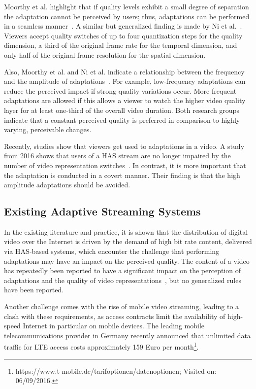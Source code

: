 Moorthy et al. highlight that if quality levels exhibit a small degree of separation the adaptation cannot be perceived by users; thus, adaptations can be performed in a seamless manner~\cite{Moorthy2012}.
A similar but generalized finding is made by Ni et al.~\cite{Ni2011}.
Viewers accept quality switches of up to four quantization steps for the quality dimension, a third of the original frame rate for the temporal dimension, and only half of the original frame resolution for the spatial dimension.

Also, Moorthy et al. and Ni et al. indicate a relationship between the frequency and the amplitude of adaptations~\cite{Moorthy2012,Ni2011}. 
For example, low-frequency adaptations can reduce the perceived impact if strong quality variations occur.
More frequent adaptations are allowed if this allows a viewer to watch the higher video quality layer for at least one-third of the overall video duration.
Both research groups indicate that a constant perceived quality is preferred in comparison to highly varying, perceivable changes.

Recently, studies show that viewers get used to adaptations in a video.
A study from 2016 shows that users of a \ac{HAS} stream are no longer impaired by the number of video representation switches~\cite{Nam2016}.
In contrast, it is more important that the adaptation is conducted in a covert manner.
Their finding is that the high amplitude adaptations should be avoided.
\subsection{Existing Adaptive Streaming Systems}
In the existing literature and practice, it is shown that the distribution of digital video over the Internet is driven by the demand of high bit rate content, delivered via \ac{HAS}-based systems, which encounter the challenge that performing adaptations may have an impact on the perceived quality.
The content of a video has repeatedly been reported to have a significant impact on the perception of adaptations and the quality of video representations~\cite{Garcia2010,Ghinea1998,Knoche2007,Knoche2005,Zhai2008}, but no generalized rules have been reported.

Another challenge comes with the rise of mobile video streaming, leading to a clash with these requirements, as access contracts limit the availability of high-speed Internet in particular on mobile devices.
The leading mobile telecommunications provider in Germany recently announced that unlimited data traffic for \ac{LTE} access costs approximately 159 Euro per month\footnote{https://www.t-mobile.de/tarifoptionen/datenoptionen; Visited on: 06/09/2016.}.
